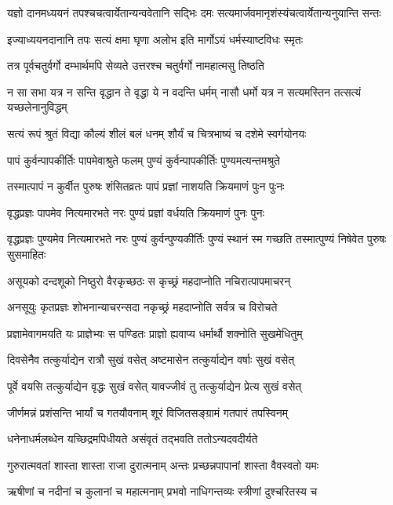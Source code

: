 \twolineshloka
{यज्ञो दानमध्ययनं तपश्चचत्वार्येतान्यन्ववेतानि सद्भिः}
{दमः सत्यमार्जवमानृशंस्यंचत्वार्येतान्यनुयान्ति सन्तः}


\twolineshloka
{इज्याध्ययनदानानि तपः सत्यं क्षमा घृणा}
{अलोभ इति मार्गोऽयं धर्मस्याष्टविधः स्मृतः}


\twolineshloka
{तत्र पूर्वचतुर्वर्गो दम्भार्थमपि सेव्यते}
{उत्तरश्च चतुर्वर्गो नामहात्मसु तिष्ठति}


\twolineshloka
{न सा सभा यत्र न सन्ति वृद्धान ते वृद्धा ये न वदन्ति धर्मम्}
{नासौ धर्मो यत्र न सत्यमस्तिन तत्सत्यं यच्छलेनानुविद्धम्}


\twolineshloka
{सत्यं रूपं श्रुतं विद्या कौल्यं शीलं बलं धनम्}
{शौर्यं च चित्रभाष्यं च दशेमे स्वर्गयोनयः}


\twolineshloka
{पापं कुर्वन्पापकीर्तिः पापमेवाश्रुते फलम्}
{पुण्यं कुर्वन्पापकीर्तिः पुण्यमत्यन्तमश्रुते}


\twolineshloka
{तस्मात्पापं न कुर्वीत पुरुषः शंसितव्रतः}
{पापं प्रज्ञां नाशयति क्रियमाणं पुःन पुःनः}


\twolineshloka
{वृद्धप्रज्ञः पापमेव नित्यमारभते नरः}
{पुण्यं प्रज्ञां वर्धयति क्रियमाणं पुनः पुनः}


\threelineshloka
{वृद्धप्रज्ञः पुण्यमेव नित्यमारभते नरः}
{पुण्यं कुर्वन्पुण्यकीर्तिः पुण्यं स्थानं स्म गच्छति}
{तस्मात्पुण्यं निषेवेत पुरुषः सुसमाहितः}


\twolineshloka
{असूयको दन्दशूको निष्ठुरो वैरकृच्छठः}
{स कृच्छ्रं महदाप्नोति नचिरात्पापमाचरन्}


\twolineshloka
{अनसूयुः कृतप्रज्ञः शोभनान्याचरन्सदा}
{नकृच्छ्रं महदाप्नोति सर्वत्र च विरोचते}


\twolineshloka
{प्रज्ञामेवागमयति यः प्राज्ञेभ्यः स पण्डितः}
{प्राज्ञो ह्यवाप्य धर्मार्थौ शक्नोति सुखमेधितुम्}


\twolineshloka
{दिवसेनैव तत्कुर्याद्येन रात्रौ सुखं वसेत्}
{अष्टमासेन तत्कुर्याद्येन वर्षाः सुखं वसेत्}


\twolineshloka
{पूर्वे वयसि तत्कुर्याद्येन वृद्धः सुखं वसेत्}
{यावज्जीवं तु तत्कुर्याद्येन प्रेत्य सुखं वसेत्}


\twolineshloka
{जीर्णमन्नं प्रशंसन्ति भार्यां च गतयौवनाम्}
{शूरं विजितसङ्ग्रामं गतपारं तपस्विनम्}


\twolineshloka
{धनेनाधर्मलब्धेन यच्छिद्रमपिधीयते}
{असंवृतं तद्भवति ततोऽन्यदवदीर्यते}


\twolineshloka
{गुरुरात्मवतां शास्ता शास्ता राजा दुरात्मनाम्}
{अन्तः प्रच्छन्नपापानां शास्ता वैवस्वतो यमः}


\twolineshloka
{ऋषीणां च नदीनां च कुलानां च महात्मनाम्}
{प्रभवो नाधिगन्तव्यः स्त्रीणां दुश्चरितस्य च}


